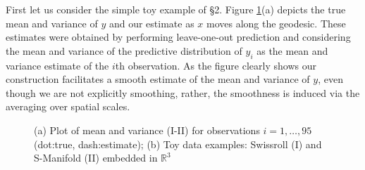 \documentclass{article}
\newcommand{\Real}{\mathbb{R}}
\begin{document}
First let us consider the simple toy example of \S 2. Figure \ref{fig1}(a) depicts the true mean and variance of $y$ and our estimate as $x$ moves along the geodesic. These estimates were obtained by performing leave-one-out prediction and considering the mean and variance of the predictive distribution of $y_i$ as the mean and variance estimate of the $i$th observation. As the figure clearly shows our construction facilitates a smooth estimate of the mean and variance of $y$, even though we are not explicitly smoothing, rather, the smoothness is induced via the averaging over spatial scales.


\begin{figure}
    \centering
    \caption{(a) Plot of mean and variance (I-II) for observations $i=1, \ldots, 95$ (dot:true, dash:estimate); (b) Toy data examples: Swissroll (I) and S-Manifold (II) embedded in $\Real^3$}
    \label{fig1}
\end{figure}
%
\end{document}
